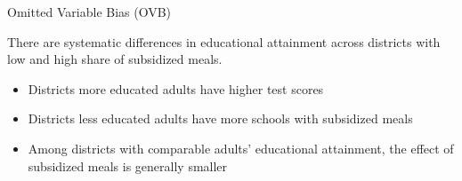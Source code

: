 \documentclass[notes,10pt, aspectratio=169]{beamer}
\begin{document}
\begin{frame}{Omitted Variable Bias (OVB)}

There are systematic differences in educational attainment across districts with low and high share of subsidized meals.
\begin{itemize}
    \item Districts more educated adults have higher test scores
    \item Districts less educated adults have more schools with subsidized meals
    \item Among districts with comparable adults' educational attainment, the effect of subsidized meals is generally smaller
\end{itemize}
\begin{center}
\end{center}
\end{frame}
\end{document}
